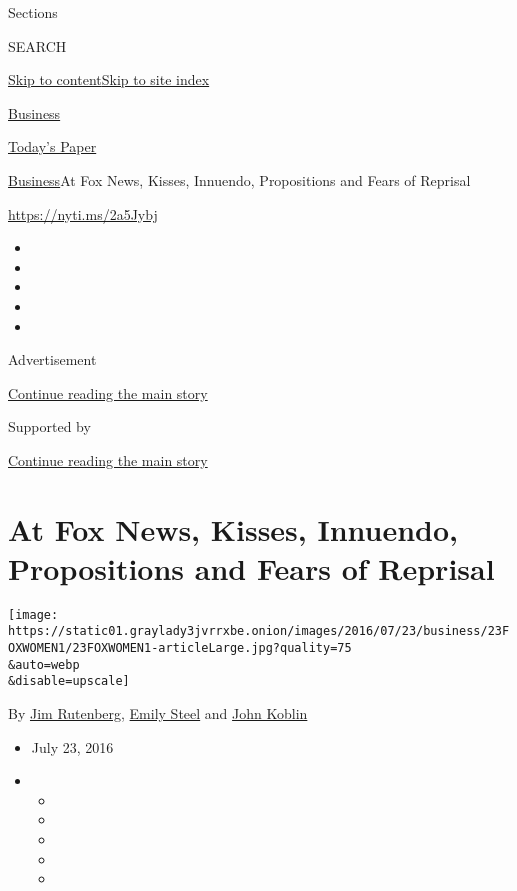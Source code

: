 Sections

SEARCH

\protect\hyperlink{site-content}{Skip to
content}\protect\hyperlink{site-index}{Skip to site index}

\href{https://www.nytimes3xbfgragh.onion/section/business}{Business}

\href{https://myaccount.nytimes3xbfgragh.onion/auth/login?response_type=cookie\&client_id=vi}{}

\href{https://www.nytimes3xbfgragh.onion/section/todayspaper}{Today's
Paper}

\href{/section/business}{Business}\textbar{}At Fox News, Kisses,
Innuendo, Propositions and Fears of Reprisal

\url{https://nyti.ms/2a5Jybj}

\begin{itemize}
\item
\item
\item
\item
\item
\end{itemize}

Advertisement

\protect\hyperlink{after-top}{Continue reading the main story}

Supported by

\protect\hyperlink{after-sponsor}{Continue reading the main story}

\hypertarget{at-fox-news-kisses-innuendo-propositions-and-fears-of-reprisal}{%
\section{At Fox News, Kisses, Innuendo, Propositions and Fears of
Reprisal}\label{at-fox-news-kisses-innuendo-propositions-and-fears-of-reprisal}}

\texttt{[image: https://static01.graylady3jvrrxbe.onion/images/2016/07/23/business/23FOXWOMEN1/23FOXWOMEN1-articleLarge.jpg?quality=75\\\&auto=webp\\\&disable=upscale]}

By \href{http://www.nytimes3xbfgragh.onion/by/jim-rutenberg}{Jim
Rutenberg},
\href{https://www.nytimes3xbfgragh.onion/by/emily-steel}{Emily Steel}
and \href{https://www.nytimes3xbfgragh.onion/by/john-koblin}{John
Koblin}

\begin{itemize}
\item
  July 23, 2016
\item
  \begin{itemize}
  \item
  \item
  \item
  \item
  \item
  \end{itemize}
\end{itemize}

